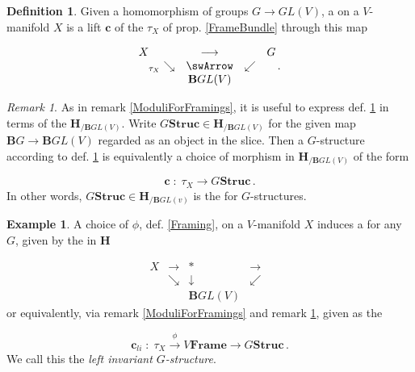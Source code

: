 \documentclass[12pt,titlepage]{article}
\def\mathllap{\mathpalette\mathllapinternal}
\def\mathllapinternal#1#2{\llap{$\mathsurround=0pt#1{#2}$}}
\newcommand{\itexarray}[1]{\begin{matrix}#1\end{matrix}}
\theoremstyle{plain}
\theoremstyle{definition}
\newtheorem{defn}{Definition}
\newtheorem{example}{Example}
\theoremstyle{remark}
\newtheorem{remark}{Remark}
\begin{document}
\begin{defn}
\label{GStructure}\hypertarget{GStructure}{}
Given a homomorphism of groups $G \longrightarrow GL(V)$, a  on a $V$-manifold $X$ is a lift $\mathbf{c}$ of the  $\tau_X$ of prop. \ref{FrameBundle} through this map

\begin{displaymath}
\itexarray{
    X && \stackrel{}{\longrightarrow} && G
    \\
    & {}_{\mathllap{\tau_X}}\searrow &\swArrow& \swarrow
    \\
    && \mathbf{B}GL(V)
  }
  \,.
\end{displaymath}
\end{defn}
\begin{remark}
\label{ModuliForGStructures}\hypertarget{ModuliForGStructures}{}
As in remark \ref{ModuliForFramings}, it is useful to express def. \ref{GStructure} in terms of the  $\mathbf{H}_{/\mathbf{B}GL(V)}$. Write $G\mathbf{Struc}\in \mathbf{H}_{/\mathbf{B}GL(V)}$ for the given map $\mathbf{B}G\to \mathbf{B}GL(V)$ regarded as an object in the slice. Then a $G$-structure according to def. \ref{GStructure} is equivalently a choice of morphism in $\mathbf{H}_{/\mathbf{B}GL(V)}$ of the form

\begin{displaymath}
\mathbf{c} \;\colon\; \tau_X \longrightarrow G\mathbf{Struc}
  \,.
\end{displaymath}
In other words, $G\mathbf{Struc} \in \mathbf{H}_{/\mathbf{B}GL(v)}$ is the  for $G$-structures.

\end{remark}
\begin{example}
\label{GStructureFromLeftTranslationFraming}\hypertarget{GStructureFromLeftTranslationFraming}{}
A choice of  $\phi$, def. \ref{Framing}, on a $V$-manifold $X$ induces a  for any $G$, given by the  in $\mathbf{H}$

\begin{displaymath}
\itexarray{
     X &\longrightarrow& \ast &\longrightarrow&
     \\
     & \searrow & \downarrow & \swarrow
     \\
     && \mathbf{B}GL(V)
  }
\end{displaymath}
or equivalently, via remark \ref{ModuliForFramings} and remark \ref{ModuliForGStructures}, given as the 

\begin{displaymath}
\mathbf{c}_{li}
  \;\colon\;
  \tau_X \stackrel{\phi}{\longrightarrow} V\mathbf{Frame} \longrightarrow G\mathbf{Struc}\,.
\end{displaymath}
We call this the \emph{left invariant $G$-structure}.

\end{example}
\end{document}
